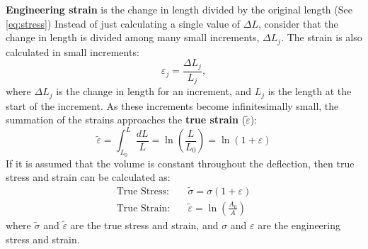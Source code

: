 \documentclass{article}
\begin{document}
    \textbf{Engineering strain} is the change in length divided by the original length (See \ref{eq:stress}) Instead of just calculating a single value of $\Delta L$, consider that the change in length is divided among many small increments, $\Delta L_j$. The strain is also calculated in small increments:
    \begin{equation}
        \varepsilon_j = \frac{\Delta L_j}{L_j},
    \end{equation}
    where $\Delta L_j$ is the change in length for an increment, and $L_j$ is the length at the start of the increment. As these increments become infinitesimally small, the summation of the strains approaches the \textbf{true strain} ($\tilde{\varepsilon}$):
    \begin{equation}
        \tilde{\varepsilon} = \int_{L_0}^{L} \frac{dL}{L}=\ln\left(\frac{L}{L_0}\right)=\ln(1+\varepsilon)
    \end{equation}
    If it is assumed that the volume is constant throughout the deflection, then true stress and strain can be calculated as:
    \begin{align}
        \text{True Stress:} & \quad \tilde{\sigma} = \sigma \left( 1 + \varepsilon \right) \\
        \text{True Strain:} & \quad \tilde{\varepsilon} = \ln \left(\frac{A_0}{A}\right)
    \end{align}
    where $\tilde{\sigma}$ and $\tilde{\varepsilon}$ are the true stress and strain, and $\sigma$ and $\varepsilon$ are the engineering stress and strain.
    \newpage
\end{document}
